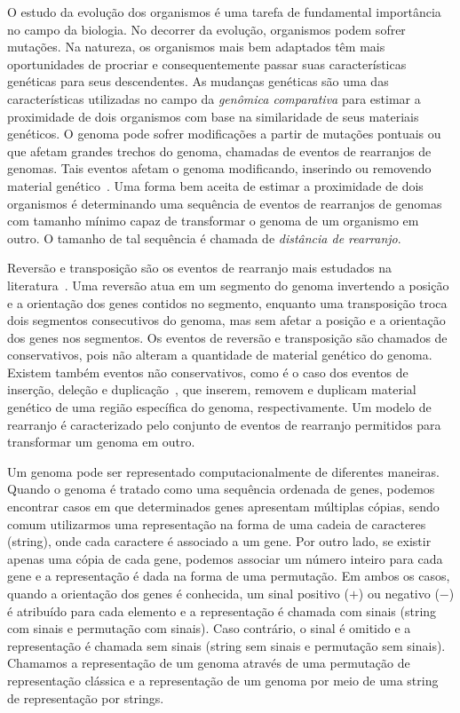 
O estudo da evolução dos organismos é uma tarefa de fundamental importância no campo da biologia. No decorrer da evolução, organismos podem sofrer mutações. Na natureza, os organismos mais bem adaptados têm mais oportunidades de procriar e consequentemente passar suas características genéticas para seus descendentes. As mudanças genéticas são uma das características utilizadas no campo da \emph{genômica comparativa} para estimar a proximidade de dois organismos com base na similaridade de seus materiais genéticos. O genoma pode sofrer modificações a partir de mutações pontuais ou que afetam grandes trechos do genoma, chamadas de eventos de rearranjos de genomas. Tais eventos afetam o genoma modificando, inserindo ou removendo material genético~\cite{2009-fertin-etal}. Uma forma bem aceita de estimar a proximidade de dois organismos é determinando uma sequência de eventos de rearranjos de genomas com tamanho mínimo capaz de transformar o genoma de um organismo em outro. O tamanho de tal sequência é chamada de \emph{distância de rearranjo}.

Reversão e transposição são os eventos de rearranjo mais estudados na literatura~\cite{1999-hannenhalli-pevzner,1999b-caprara,2012-bulteau-etal,2019b-oliveira-etal}. Uma reversão atua em um segmento do genoma invertendo a posição e a orientação dos genes contidos no segmento, enquanto uma transposição troca dois segmentos consecutivos do genoma, mas sem afetar a posição e a orientação dos genes nos segmentos. Os eventos de reversão e transposição são chamados de conservativos, pois não alteram a quantidade de material genético do genoma. Existem também eventos não conservativos, como é o caso dos eventos de inserção, deleção e duplicação~\cite{2013-willing-etal,2012-elmabrouk-sankoff,2008-kahn-raphael,2020-mane-etal,2009-bader}, que inserem, removem e duplicam material genético de uma região específica do genoma, respectivamente. Um modelo de rearranjo é caracterizado pelo conjunto de eventos de rearranjo permitidos para transformar um genoma em outro.

Um genoma pode ser representado computacionalmente de diferentes maneiras. Quan\-do o genoma é tratado como uma sequência ordenada de genes, podemos encontrar casos em que determinados genes apresentam múltiplas cópias, sendo comum utilizarmos uma representação na forma de uma cadeia de caracteres (string), onde cada caractere é associado a um gene. Por outro lado, se existir apenas uma cópia de cada gene, podemos associar um número inteiro para cada gene e a representação é dada na forma de uma permutação. Em ambos os casos, quando a orientação dos genes é conhecida, um sinal positivo ($+$) ou negativo ($-$) é atribuído para cada elemento e a representação é chamada com sinais (string com sinais e permutação com sinais). Caso contrário, o sinal é omitido e a representação é chamada sem sinais (string sem sinais e permutação sem sinais). Chamamos a representação de um genoma através de uma permutação de representação clássica e a representação de um genoma por meio de uma string de representação por strings.

